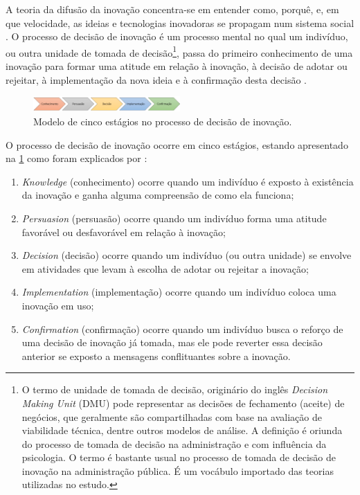 \documentclass{textolivre}
\begin{document}
A teoria da difusão da inovação concentra-se em entender como, porquê, e, em que velocidade, as ideias e tecnologias inovadoras se propagam num sistema social \cite{rogers1983}. O processo de decisão de inovação é um processo mental no qual um indivíduo, ou outra unidade de tomada de decisão\footnote{O termo de unidade de tomada de decisão, originário do inglês \textit{Decision Making Unit} (DMU) pode representar as decisões de fechamento (aceite) de negócios, que geralmente são compartilhadas com base na avaliação de viabilidade técnica, dentre outros modelos de análise. A definição é oriunda do processo de tomada de decisão na administração e com influência da psicologia. O termo é bastante usual no processo de tomada de decisão de inovação na administração pública. É um vocábulo importado das teorias utilizadas no estudo.}, passa do primeiro conhecimento de uma inovação para formar uma atitude em relação à inovação, à decisão de adotar ou rejeitar, à implementação da nova ideia e à confirmação desta decisão \cite{davis1989,rogers1983}.

\begin{figure}[htbp]
 \centering
 \includegraphics[width=0.5\textwidth]{Fig01.png}
 \caption{Modelo de cinco estágios no processo de decisão de inovação.}
 \label{Fig01}
\end{figure}

O processo de decisão de inovação ocorre em cinco estágios, estando apresentado na \cref{Fig01} como foram explicados por \textcite[p. 36]{rogers1983}:

\begin{enumerate}
\item \textit{Knowledge} (conhecimento) ocorre quando um indivíduo é exposto à existência da inovação e ganha alguma compreensão de como ela funciona;
\item \textit{Persuasion} (persuasão) ocorre quando um indivíduo forma uma atitude favorável ou desfavorável em relação à inovação;
\item \textit{Decision} (decisão) ocorre quando um indivíduo (ou outra unidade) se envolve em atividades que levam à escolha de adotar ou rejeitar a inovação;
\item \textit{Implementation} (implementação) ocorre quando um indivíduo coloca uma inovação em uso;
\item \textit{Confirmation} (confirmação) ocorre quando um indivíduo busca o reforço de uma decisão de inovação já tomada, mas ele pode reverter essa decisão anterior se exposto a mensagens conflituantes sobre a inovação.
\end{enumerate}
\end{document}
